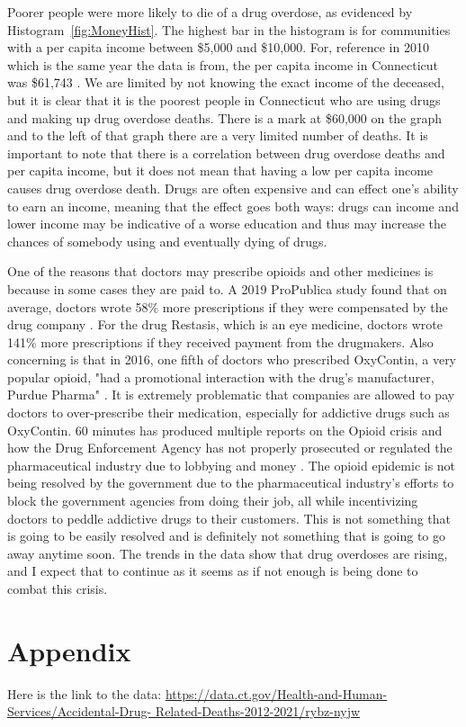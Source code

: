 \documentclass[12pt, letterpaper, titlepage]{article}
\begin{document}
Poorer people were more likely to die of a drug overdose, as evidenced by Histogram~\ref{fig:MoneyHist}.  The highest bar in the histogram is for communities with a per capita income between \$5,000 and \$10,000.  For, reference in 2010 which is the same year the data is from, the per capita income in Connecticut was \$61,743 \citet{fred_2023}.  We are limited by not knowing the exact income of the deceased, but it is clear that it is the poorest people in Connecticut who are using drugs and making up drug overdose deaths.  There is a mark at \$60,000 on the graph and to the left of that graph there are a very limited number of deaths.  It is  important to note that there is a correlation between drug overdose deaths and per capita income, but it does not mean that having a low per capita income causes drug overdose death.  Drugs are often expensive and can effect one's ability to earn an income, meaning that the effect goes both ways: drugs can income and lower income may be indicative of a worse education and thus may increase the chances of somebody using and eventually dying of drugs.

One of the reasons that doctors may prescribe opioids and other medicines is because in some cases they are paid to.  A 2019 ProPublica study found that on average, doctors wrote 58\% more prescriptions if they were compensated by the drug company \citep{fresques_2019}.  For the drug Restasis, which is an eye medicine, doctors wrote 141\% more prescriptions if they received payment from the drugmakers.  Also concerning is that in 2016, one fifth of doctors who prescribed OxyContin, a very popular opioid, "had a promotional interaction with the drug's manufacturer, Purdue Pharma" \citep{fresques_2019}.  It is extremely problematic that companies are allowed to pay doctors to over-prescribe their medication, especially for addictive drugs such as OxyContin.  60 minutes has produced multiple reports on the Opioid crisis and how the Drug Enforcement Agency has not properly prosecuted or regulated the pharmaceutical industry due to lobbying and money \citep{cbs_2020}.  The opioid epidemic is not being resolved by the government due to the pharmaceutical industry's efforts to block the government agencies from doing their job, all while incentivizing doctors to peddle addictive drugs to their customers.  This is not something that is going to be easily resolved and is definitely not something that is going to go away anytime soon.  The trends in the data show that drug overdoses are rising, and I expect that to continue as it seems as if not enough is being done to combat this crisis.

\section{Appendix}
Here is the link to the data: \url{https://data.ct.gov/Health-and-Human-Services/Accidental-Drug-
Related-Deaths-2012-2021/rybz-nyjw}



\end{document}
